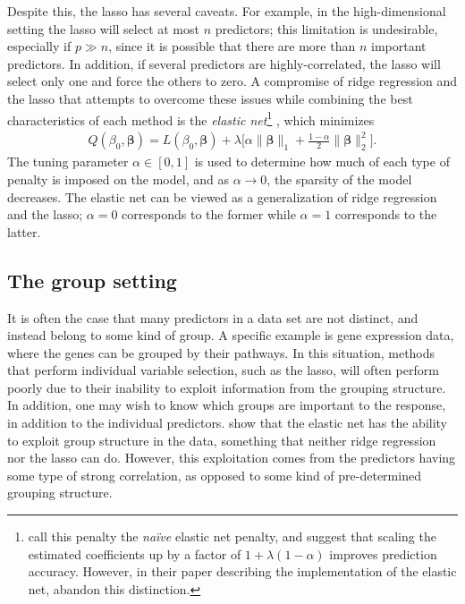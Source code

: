 \documentclass[11pt]{article}
\newcommand{\citeay}[1]{\citeauthor{#1} \citeyear{#1}}
\begin{document}
Despite this, the lasso has several caveats. For example, in the high-dimensional setting the lasso will select at most $n$ predictors; this limitation is undesirable, especially if $p \gg n$, since it is possible that there are more than $n$ important predictors. In addition, if several predictors are highly-correlated, the lasso will select only one and force the others to zero. A compromise of ridge regression and the lasso that attempts to overcome these issues while combining the best characteristics of each method is the \textit{elastic net}\footnote{\citeay{zou2005regularization} call this penalty the \textit{na\"{i}ve} elastic net penalty, and suggest that scaling the estimated coefficients up by a factor of $1 + \lambda(1 - \alpha)$ improves prediction accuracy. However, in their paper describing the implementation of the elastic net, \citeay{friedman2010regularization} abandon this distinction.} \cite{zou2005regularization}, which minimizes
\begin{align}
    \label{elasticnet}
    Q(\beta_0, \bm{\beta}) = L(\beta_0, \bm{\beta})
    + \lambda \Big[ \alpha \| \bm{\beta} \|_{1} + \frac{1 - \alpha}{2} \|\bm{\beta}\|_{2}^{2} \Big].
\end{align}
The tuning parameter $\alpha \in [0,1]$ is used to determine how much of each type of penalty is imposed on the model, and as $\alpha \to 0$, the sparsity of the model decreases. The elastic net can be viewed as a generalization of ridge regression and the lasso; $\alpha = 0$ corresponds to the former while $\alpha = 1$ corresponds to the latter. 

\subsection{The group setting}

It is often the case that many predictors in a data set are not distinct, and instead belong to some kind of group. A specific example is gene expression data, where the genes can be grouped by their pathways. In this situation, methods that perform individual variable selection, such as the lasso, will often perform poorly due to their inability to exploit information from the grouping structure. In addition, one may wish to know which groups are important to the response, in addition to the individual predictors. 
\citeay{zou2005regularization} show that the elastic net has the ability to exploit group structure in the data, something that neither ridge regression nor the lasso can do. However, this exploitation comes from the predictors having some type of strong correlation, as opposed to some kind of pre-determined grouping structure. 
\end{document}
